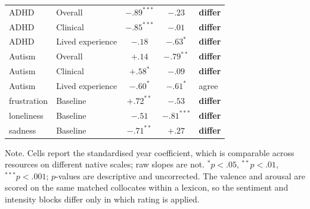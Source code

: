 \begin{table}[t!]
\begin{tabular}{@{}llccl@{}}
ADHD & Overall & $-.89^{***}$ & $-.23$ & \textbf{differ} \\
ADHD & Clinical & $-.85^{***}$ & $-.01$ & \textbf{differ} \\
ADHD & Lived experience & $-.18$ & $-.63^{*}$ & \textbf{differ} \\
Autism & Overall & $+.14$ & $-.79^{**}$ & \textbf{differ} \\
Autism & Clinical & $+.58^{*}$ & $-.09$ & \textbf{differ} \\
Autism & Lived experience & $-.60^{*}$ & $-.61^{*}$ & agree \\
frustration & Baseline & $+.72^{**}$ & $-.53$ & \textbf{differ} \\
loneliness & Baseline & $-.51$ & $-.81^{***}$ & \textbf{differ} \\
sadness & Baseline & $-.71^{**}$ & $+.27$ & \textbf{differ} \\
\bottomrule
\end{tabular}
\par\vspace{3pt}
\parbox{\linewidth}{\footnotesize Note. Cells report the standardised year coefficient,
which is comparable across resources on different native scales; raw slopes are not.
$^{*}p<.05$, $^{**}p<.01$, $^{***}p<.001$; $p$-values are descriptive and uncorrected. The
valence and arousal are scored on the same matched collocates within a lexicon, so the
sentiment and intensity blocks differ only in which rating is applied.}
\end{table}
